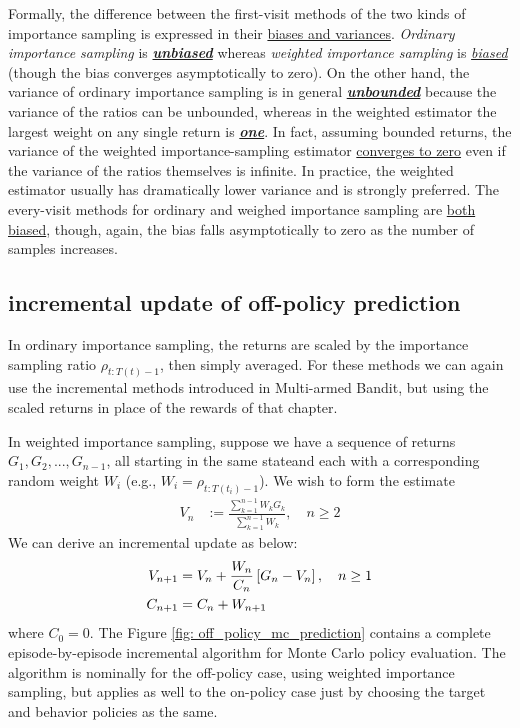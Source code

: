 \documentclass[11pt]{article}
\begin{document}
Formally, the difference between the first-visit methods of the two kinds of importance sampling is expressed in their \underline{biases and variances}. \emph{Ordinary importance sampling} is  \underline{\emph{\textbf{unbiased}}} whereas \emph{weighted importance sampling} is \underline{\emph{biased}} (though the bias converges asymptotically to zero). On the other hand, the variance of ordinary importance sampling is in general \underline{\emph{\textbf{unbounded}}} because the variance of the ratios can be unbounded, whereas in the weighted estimator the largest weight on any single return is  \underline{\textbf{\emph{one}}}. In fact, assuming bounded returns, the variance of the weighted importance-sampling estimator \underline{converges to zero} even if the variance of the ratios themselves is infinite. In practice, the weighted estimator usually has dramatically lower variance and is strongly preferred.  The every-visit methods for ordinary and weighed importance sampling are \underline{both biased}, though, again, the bias falls asymptotically to zero as the number of samples increases.

\subsection{incremental update of off-policy prediction}
In ordinary importance sampling, the returns are scaled by the importance sampling ratio $\rho_{t:T(t)-1}$, then simply averaged. For these methods we can again
use the incremental methods introduced in Multi-armed Bandit, but using the scaled returns in place of the rewards of that chapter. 

In weighted importance sampling, suppose we have a sequence of returns $G_1, G_2, . . . , G_{n-1}$, all starting in the same stateand each with a corresponding random weight $W_i$ (e.g., $W_i = \rho_{t:T(t_{i})-1}$). We wish to form the estimate
\begin{align*}
V_{n} &:=  \frac{\sum_{k=1}^{n-1}W_{k}G_{k}}{\sum_{k=1}^{n-1}W_{k}}, \quad n\ge 2
\end{align*} We can derive an incremental update as below:
\begin{align}
V_{n+1} &= V_{n} + \frac{W_{n}}{C_{n}}\left[G_{n} - V_{n}\right], \quad n\ge 1 \label{eqn: incremental_update_weighted_IS} \\
     C_{n+1} &= C_{n} + W_{n+1} \label{eqn: incremental_update_weighted_IS2}
\end{align} where $C_{0}=0$. The Figure \ref{fig: off_policy_mc_prediction} contains a complete episode-by-episode incremental algorithm for Monte Carlo policy evaluation. The algorithm is nominally for the off-policy case, using weighted importance sampling, but applies as well to the on-policy case just by choosing the target and behavior policies as the same.
\end{document}

